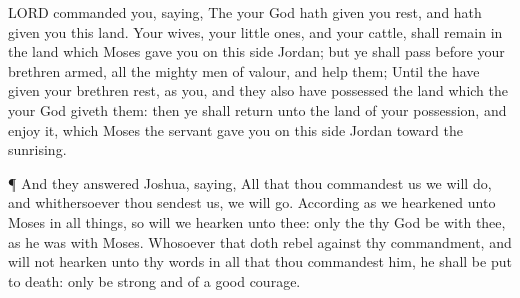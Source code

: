 {{{LORD}}
commanded you,
saying, The
{} your
God hath given you
rest, and hath
given you this
land.
Your
wives, your little
ones, and your
cattle, shall
remain in the
land which
Moses
gave you on this
side
Jordan; but ye shall
pass
before your
brethren
armed, all the
mighty men of
valour, and
help them;
Until the
{} have
given your
brethren
rest, as
{} you, and they also have
possessed the
land which the
{} your
God
giveth them: then ye shall
return unto the
land of your
possession, and
enjoy it, which
Moses the
{}
servant
gave you on this
side
Jordan toward the
sunrising.
\par }{\PP {}¶ And they
answered
Joshua,
saying, All that thou
commandest us we will
do, and
whithersoever thou
sendest us, we will
go.
According as we
hearkened unto
Moses in all things, so will we
hearken unto thee: only the
{} thy
God be with thee, as he was with
Moses.
Whosoever
{} that doth
rebel against thy
commandment, and will not
hearken unto thy
words in all that thou
commandest him, he shall be put to
death: only be
strong and of a good
courage.

}
